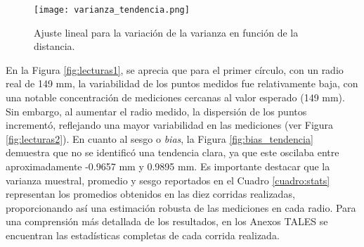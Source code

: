 \begin{table}[H]
	\centering
	\caption{Estadísticas de precisión: valores promedio de distancia, sesgo y varianza muestral obtenidos para cada radio tras las diez corridas realizadas.} 
	\label{cuadro:stats}
\end{table}

\begin{figure}[H]
	\centering
	\texttt{[image: varianza\_tendencia.png]}
	\caption{Ajuste lineal para la variación de la varianza en función de la distancia.}
	\label{fig:varianza_tendencia}
\end{figure}

En la Figura \ref{fig:lecturas1}, se aprecia que para el primer círculo, con un radio real de 149 mm, la variabilidad de los puntos medidos fue relativamente baja, con una notable concentración de mediciones cercanas al valor esperado (149 mm). Sin embargo, al aumentar el radio medido, la dispersión de los puntos incrementó, reflejando una mayor variabilidad en las mediciones (ver Figura \ref{fig:lecturas2}). En cuanto al sesgo o \textit{bias}, la Figura \ref{fig:bias_tendencia} demuestra que no se identificó una tendencia clara, ya que este oscilaba entre aproximadamente -0.9657 mm y 0.9895 mm. Es importante destacar que la varianza muestral, promedio y sesgo reportados en el Cuadro \ref{cuadro:stats} representan los promedios obtenidos en las diez corridas realizadas, proporcionando así una estimación robusta de las mediciones en cada radio. Para una comprensión más detallada de los resultados, en los Anexos TALES se encuentran las estadísticas completas de cada corrida realizada.


